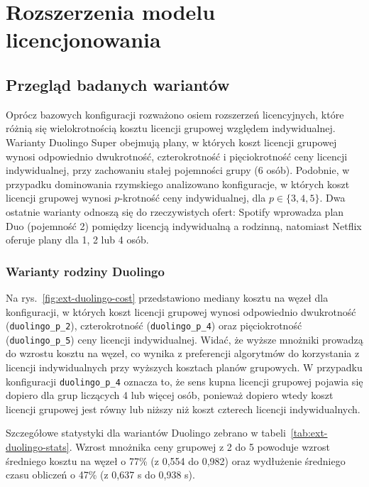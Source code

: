 \chapter{Rozszerzenia modelu licencjonowania}\label{chap:extensions}

\section{Przegląd badanych wariantów}
Oprócz bazowych konfiguracji rozważono osiem rozszerzeń licencyjnych, które różnią się wielokrotnością kosztu licencji grupowej względem indywidualnej. Warianty Duolingo Super obejmują plany, w których koszt licencji grupowej wynosi odpowiednio dwukrotność, czterokrotność i pięciokrotność ceny licencji indywidualnej, przy zachowaniu stałej pojemności grupy (6 osób). Podobnie, w przypadku dominowania rzymskiego analizowano konfiguracje, w których koszt licencji grupowej wynosi $p$-krotność ceny indywidualnej, dla $p \in \{3, 4, 5\}$. Dwa ostatnie warianty odnoszą się do rzeczywistych ofert: Spotify wprowadza plan Duo (pojemność 2) pomiędzy licencją indywidualną a rodzinną, natomiast Netflix oferuje plany dla 1, 2 lub 4 osób.

\subsection{Warianty rodziny Duolingo}
Na rys.~\ref{fig:ext-duolingo-cost} przedstawiono mediany kosztu na węzeł dla konfiguracji, w których koszt licencji grupowej wynosi odpowiednio dwukrotność (\texttt{duolingo\_p\_2}), czterokrotność (\texttt{duolingo\_p\_4}) oraz pięciokrotność (\texttt{duolingo\_p\_5}) ceny licencji indywidualnej. Widać, że wyższe mnożniki prowadzą do wzrostu kosztu na węzeł, co wynika z preferencji algorytmów do korzystania z licencji indywidualnych przy wyższych kosztach planów grupowych. W przypadku konfiguracji \texttt{duolingo\_p\_4} oznacza to, że sens kupna licencji grupowej pojawia się dopiero dla grup liczących 4 lub więcej osób, ponieważ dopiero wtedy koszt licencji grupowej jest równy lub niższy niż koszt czterech licencji indywidualnych.

Szczegółowe statystyki dla wariantów Duolingo zebrano w tabeli~\ref{tab:ext-duolingo-stats}. Wzrost mnożnika ceny grupowej z 2 do 5 powoduje wzrost średniego kosztu na węzeł o 77\% (z 0,554 do 0,982) oraz wydłużenie średniego czasu obliczeń o 47\% (z 0,637 s do 0,938 s).

